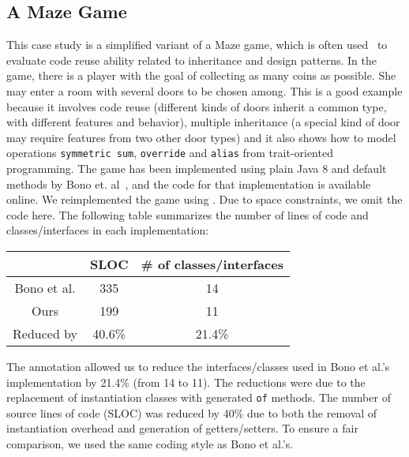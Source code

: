 
\subsection{A Maze Game}
This case study is a simplified variant of a Maze game, which is often
used~\cite{gof,bono14}
to evaluate code reuse ability related to inheritance and design
patterns. In the game, there is a player with the goal of collecting
as many coins as possible. She may enter a room with several doors to
be chosen among. This is a good example because it involves code reuse
(different kinds of doors inherit a common type, with different
features and behavior), multiple inheritance (a special kind of door
may require features from two other door types) and it also shows how
to model operations \texttt{symmetric sum}, \texttt{override} and
\texttt{alias} from trait-oriented programming. The game has been
implemented using plain Java 8 and default methods by Bono
et. al~\cite{bono14}, and the code for that implementation is
available online. We reimplemented the game using \mixin. Due to space
constraints, we omit the code here. The following table summarizes
the number of lines of code and classes/interfaces in each implementation:

\vspace{5pt}
\begin{tabular}{ccc}
\hline
            & SLOC   & \# of classes/interfaces \\ \hline
Bono et al. & 335    & 14                       \\
Ours        & 199    & 11                       \\
\rowcolor[HTML]{C0C0C0}
Reduced by  & 40.6\% & 21.4\%                   \\ \hline
\end{tabular}
\vspace{5pt}

\noindent The \mixin annotation allowed us to reduce the interfaces/classes used
in Bono et al.'s implementation by 21.4\% (from 14 to 11). The
reductions were due to the replacement of instantiation classes with
generated \texttt{of} methods. The number of source lines of code (SLOC)
was reduced by 40\% due to both the removal of instantiation overhead and
generation of getters/setters. %
To ensure a fair comparison, we used the same coding style as Bono et al.'s.

